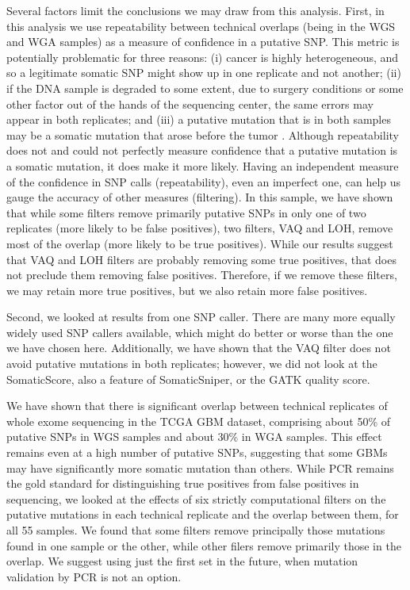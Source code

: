 \documentclass[11pt]{article} %
\begin{document}
Several factors limit the conclusions we may draw from this analysis. First, in this analysis we use repeatability between technical overlaps (being in the WGS and WGA samples) as a measure of confidence in a putative SNP. This metric is potentially problematic for three reasons: (i) cancer is highly heterogeneous, and so a legitimate somatic SNP might show up in one replicate and not another; (ii) if the DNA sample is degraded to some extent, due to surgery conditions or some other factor out of the hands of the sequencing center, the same errors may appear in both replicates; and (iii) a putative mutation that is in both samples may be a somatic mutation that arose before the tumor \citep{pre-tumor-muts}. Although repeatability does not and could not perfectly measure confidence that a putative mutation is a somatic mutation, it does make it more likely. Having an independent measure of the confidence in SNP calls (repeatability), even an imperfect one, can help us gauge the accuracy of other measures (filtering).  In this sample, we have shown that while some filters remove primarily putative SNPs in only one of two replicates (more likely to be false positives), two filters, VAQ and LOH, remove most of the overlap (more likely to be true positives). While our results suggest that VAQ and LOH filters are probably removing some true positives, that does not preclude them removing false positives. Therefore, if we remove these filters, we may retain more true positives, but we also retain more false positives. 

Second, we looked at results from one SNP caller. There are many more equally widely used SNP callers available, which might do better or worse than the one we have chosen here. Additionally, we have shown that the VAQ filter does not avoid putative mutations in both replicates; however, we did not look at the SomaticScore, also a feature of SomaticSniper, or the GATK quality score. 

We have shown that there is significant overlap between technical replicates of whole exome sequencing in the TCGA GBM dataset, comprising about 50\% of putative SNPs in WGS samples and about 30\% in WGA samples. This effect remains even at a high number of putative SNPs, suggesting that some GBMs may have significantly more somatic mutation than others. While PCR remains the gold standard for distinguishing true positives from false positives in sequencing, we looked at the effects of six strictly computational filters on the putative mutations in each technical replicate and the overlap between them, for all 55 samples. We found that some filters remove principally those mutations found in one sample or the other, while other filers remove primarily those in the overlap. We suggest using just the first set in the future, when mutation validation by PCR is not an option.
\end{document}
